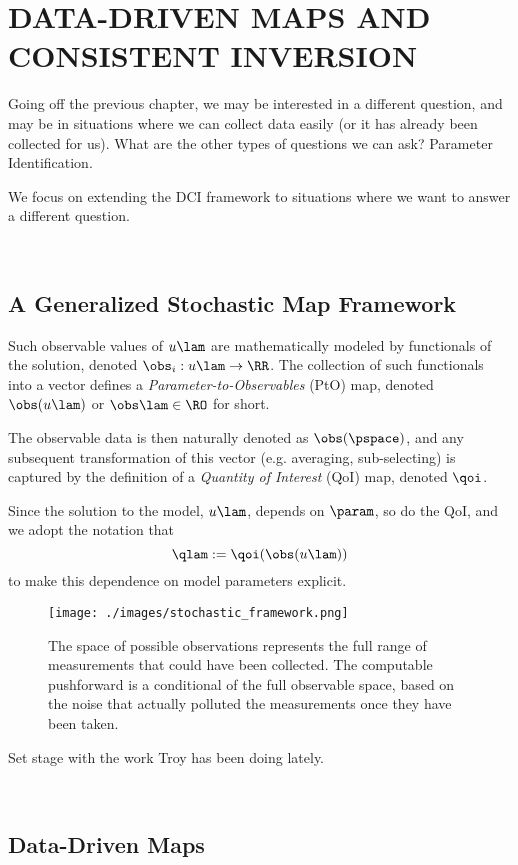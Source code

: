 \chapter{\uppercase{Data-Driven Maps and Consistent Inversion} \label{chapter:mud}}

Going off the previous chapter, we may be interested in a different question, and may be in situations where we can collect data easily (or it has already been collected for us).
What are the other types of questions we can ask? Parameter Identification.

We focus on extending the DCI framework to situations where we want to answer a different question.

\
\section{A Generalized Stochastic Map Framework}
Such observable values of $u\lam$ are mathematically modeled by functionals of the solution, denoted $\obs_i: u\lam \to \RR$.
The collection of such functionals into a vector defines a {\em Parameter-to-Observables} (PtO) map, denoted $\obs( u\lam )$ or $\obs\lam\in\RO$ for short.

The observable data is then naturally denoted as $\obs(\pspace)$, and any subsequent transformation of this vector (e.g. averaging, sub-selecting) is captured by the definition of a {\em Quantity of Interest} (QoI) map, denoted $\qoi$.

Since the solution to the model, $u\lam$, depends on $\param$, so do the QoI, and we adopt the notation that $$\qlam := \qoi(\obs(u\lam))$$ to make this dependence on model parameters explicit.

\begin{figure}[ht]
\begin{minipage}{.975\textwidth}
\texttt{[image: ./images/stochastic\_framework.png]}
\end{minipage}
\caption{
The space of possible observations represents the full range of measurements that could have been collected.
The computable pushforward is a conditional of the full observable space, based on the noise that actually polluted the measurements once they have been taken.
}
\label{fig:stochastic_framework}
\end{figure}
\FloatBarrier

Set stage with the work Troy has been doing lately.

\
\section{Data-Driven Maps}

